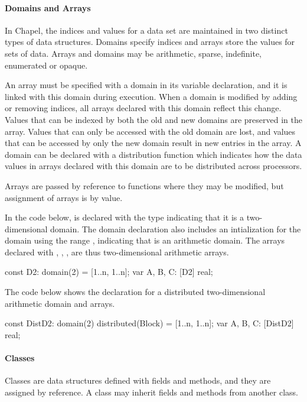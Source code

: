 \paragraph{Domains and Arrays}
In Chapel, the indices and values for a data set are maintained
in two distinct types of data structures.  Domains specify indices
and arrays store the values for sets of data.  Arrays and domains may
be arithmetic, sparse, indefinite, enumerated or opaque.

An array must be specified with a domain in its variable declaration, and 
it is linked with this domain during execution.
When a domain is modified by adding or removing indices, all arrays declared with
this domain reflect this change.  Values that can be indexed by both the
old and new domains are preserved in the array.  Values that can only be
accessed with the old domain are lost, and values that can be accessed by only
the new domain result in new entries in the array.
A domain can be declared with a distribution function which indicates how the 
data values in arrays declared with this domain are to be distributed across
processors.

Arrays are passed by reference to functions
where they may be modified, but assignment of arrays is by value.  

\begin{example}
In the code below,  is declared with the type 
indicating that it is a two-dimensional domain.  The domain declaration
also includes an intialization for the domain using the range ,
indicating that  is an arithmetic domain.  The arrays declared
with , , ,  are thus two-dimensional
arithmetic arrays.
\begin{chapel}
const D2: domain(2) = [1..n, 1..n];
var A, B, C: [D2] real;
\end{chapel}

The code below shows the declaration for a distributed two-dimensional 
arithmetic domain and arrays.
\begin{chapel}
const DistD2: domain(2) distributed(Block) = [1..n, 1..n];
var A, B, C: [DistD2] real;
\end{chapel}
\end{example}

\paragraph{Classes}
Classes are data structures defined with fields and methods, and
they are assigned by reference.  A class may inherit fields and
methods from another class.  

